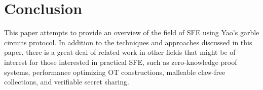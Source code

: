 \section{Conclusion}
\label{sec:conclusion}

This paper attempts to provide an overview of the field of \ac{SFE} using Yao's garble circuits protocol.  In addition to the techniques and approaches discussed in this paper, there is a great deal of related work in other fields that might be of interest for those interested in practical \ac{SFE}, such as zero-knowledge proof systems, performance optimizing \ac{OT} constructions, malleable claw-free collections, and verifiable secret sharing.
